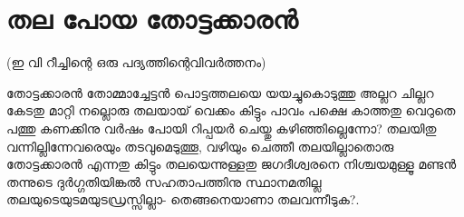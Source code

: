 \section{തല പോയ തോട്ടക്കാരൻ}
\obeylines
\noindent
(ഇ വി റീച്ചിന്റെ ഒരു പദ്യത്തിന്റെവിവർത്തനം)

തോട്ടക്കാരൻ തോമ്മാച്ചേട്ടൻ
പൊട്ടത്തലയെ യയച്ചുകൊടുത്തു
അല്ലറ ചില്ലറ കേടതു മാറ്റി
നല്ലൊരു തലയായ് വെക്കം കിട്ടും
പാവം പക്ഷെ കാത്തതു വെറുതെ
പത്തു കണക്കിനു വർഷം പോയി
റിപ്പയർ ചെയ്തു കഴിഞ്ഞില്ലെന്നോ?
തലയിതു വന്നില്ലിന്നേവരെയും
തടവുമെടുത്തൂ, വഴിയും ചെത്തീ
തലയില്ലാതൊരു തോട്ടക്കാരൻ
എന്നതു കിട്ടും തലയെന്നുള്ളതു
ജഗദീശ്വരനെ നിശ്ചയമുള്ളൂ
മണ്ടൻ തന്നുടെ ദുർഗ്ഗതിയിങ്കൽ
സഹതാപത്തിനു സ്ഥാനമതില്ല
തലയുടെയുടമയുടഡ്രസ്സില്ലാ-
തെങ്ങനെയാണാ തലവന്നീടുക?.
